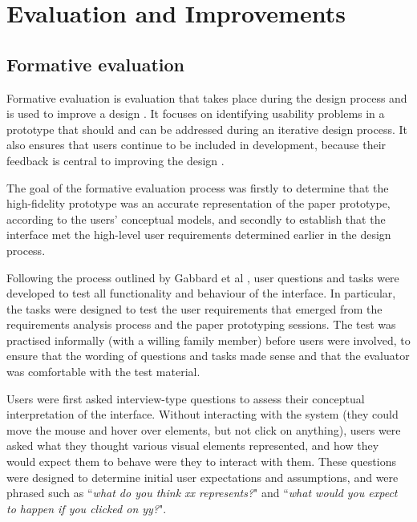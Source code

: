 
\chapter{Evaluation and Improvements} %

\label{Evaluation and Improvements} %




\section{Formative evaluation}
Formative evaluation is evaluation that takes place during the design process and is used to improve a design \citep[p. 149]{Hartson}. It focuses on identifying usability problems in a prototype that should and can be addressed during an iterative design process. It also ensures that users continue to be included in development, because their feedback is central to improving the design \citep{GabbardHix}. 

The goal of the formative evaluation process was firstly to determine that the high-fidelity prototype was an accurate representation of the paper prototype, according to the users' conceptual models, and secondly to establish that the interface met the high-level user requirements determined earlier in the design process.

Following the process outlined by Gabbard et al  \citep{GabbardHix}, user questions and tasks were developed to test all functionality and behaviour of the interface. In particular, the tasks were designed to test the user requirements that emerged from the requirements analysis process and the paper prototyping sessions. The test was practised informally (with a willing family member) before users were involved, to ensure that the wording of questions and tasks made sense and that the evaluator was comfortable with the test material.

Users were first asked interview-type questions to assess their conceptual interpretation of the interface. Without interacting with the system (they could move the mouse and hover over elements, but not click on anything), users were asked what they thought various visual elements represented, and how they would expect them to behave were they to interact with them. These questions were designed to determine initial user expectations and assumptions, and were phrased such as ``\textit{what do you think xx represents?}" and ``\textit{what would you expect to happen if you clicked on yy?}". 

